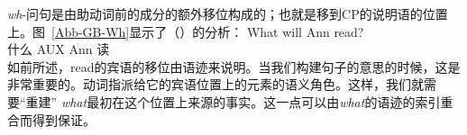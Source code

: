\emph{wh}-问句是由助动词前的成分的额外移位构成的；也就是移到CP的说明语的位置上。图~\vref{Abb-GB-Wh}显示了（）的分析：
\ea
\gll What will Ann read?\\
      什么 AUX Ann 读\\
\z
%
如前所述，read的宾语的移位由语迹来说明。当我们构建句子的意思的时候，这是非常重要的。动词指派给它的宾语位置上的元素的语义角色。这样，我们就需要``重建'' \emph{what}最初在这个位置上来源的事实。这一点可以由\emph{what}的语迹的索引重合而得到保证。


